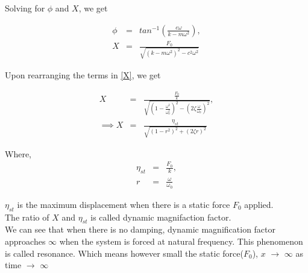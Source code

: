 \documentclass[10pt]{beamer}
\begin{document}
\begin{frame}
Solving for $\phi$ and $X$, we get

\begin{eqnarray}
\phi &=& tan^{-1} \left( \frac{c\omega}{k - m\omega^2} \right), \\
\label{X}
X &=& \frac{F_0}{\sqrt{\left( k - m\omega^2\right)^2 - c^2\omega^2}}
\end{eqnarray}

Upon rearranging the terms in \ref{X}, we get 

\begin{eqnarray}
X &=& \frac{ \frac{F_0}{k} }{ \sqrt{ \left( 1 - \frac{\omega^2}{\omega_0^2} \right)^2 - \left( 2\zeta \frac{\omega}{\omega_0} \right)^2 } }, \\
\implies X &=& \frac{ \eta_{st} }{ \sqrt{ \left( 1 - r^2 \right)^2 + \left( 2\zeta r \right)^2 } } 
\end{eqnarray}

\end{frame}

\begin{frame}
Where,
\begin{eqnarray}
\eta_{st} &=& \frac{F_0}{k}, \\
r &=& \frac{\omega}{\omega_0}
\end{eqnarray}

$\eta_{st}$ is the maximum displacement when there is a static force $F_0$ applied. \\
The ratio  of $X$ and $\eta_{st}$ is called dynamic magnifaction factor. \\
We can see that when there is no damping, dynamic magnification factor approaches $\infty$ 
when the system is forced at natural frequency. This phenomenon is called resonance. Which means 
however small the static force($F_0$), $x$ $\rightarrow$ $\infty$ as time $\rightarrow$ $\infty$

\end{frame}

{}

 
\end{document}
